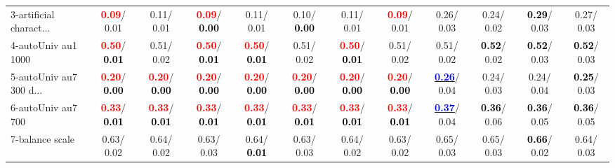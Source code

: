 \begin{table}[h]
\begin{center}
{\begin{tabular}{lc|c|c|c|c|c|c|c|c|c|c}
3-artificial charact... & \textcolor{red}{\textbf{  0.09}}/  0.01 &   0.11/  0.01 & \textcolor{red}{\textbf{  0.09}}/\textcolor{black}{\textbf{  0.00}} &   0.11/  0.01 &   0.10/\textcolor{black}{\textbf{  0.00}} &   0.11/  0.01 & \textcolor{red}{\textbf{  0.09}}/  0.01 &   0.26/  0.03 &   0.24/  0.02 & \textcolor{black}{\textbf{  0.29}}/  0.03 &   0.27/  0.03 \\
4-autoUniv au1 1000 & \textcolor{red}{\textbf{  0.50}}/\textcolor{black}{\textbf{  0.01}} &   0.51/  0.02 & \textcolor{red}{\textbf{  0.50}}/\textcolor{black}{\textbf{  0.01}} & \textcolor{red}{\textbf{  0.50}}/\textcolor{black}{\textbf{  0.01}} &   0.51/  0.02 & \textcolor{red}{\textbf{  0.50}}/\textcolor{black}{\textbf{  0.01}} &   0.51/  0.02 &   0.51/  0.02 & \textcolor{black}{\textbf{  0.52}}/  0.02 & \textcolor{black}{\textbf{  0.52}}/  0.03 & \textcolor{black}{\textbf{  0.52}}/  0.03 \\
5-autoUniv au7 300 d... & \textcolor{red}{\textbf{  0.20}}/\textcolor{black}{\textbf{  0.00}} & \textcolor{red}{\textbf{  0.20}}/\textcolor{black}{\textbf{  0.00}} & \textcolor{red}{\textbf{  0.20}}/\textcolor{black}{\textbf{  0.00}} & \textcolor{red}{\textbf{  0.20}}/\textcolor{black}{\textbf{  0.00}} & \textcolor{red}{\textbf{  0.20}}/\textcolor{black}{\textbf{  0.00}} & \textcolor{red}{\textbf{  0.20}}/\textcolor{black}{\textbf{  0.00}} & \textcolor{red}{\textbf{  0.20}}/\textcolor{black}{\textbf{  0.00}} & \underline{\textcolor{blue}{\textbf{  0.26}}}/  0.04 &   0.24/  0.03 &   0.24/  0.04 & \textcolor{black}{\textbf{  0.25}}/  0.03 \\
6-autoUniv au7 700 & \textcolor{red}{\textbf{  0.33}}/\textcolor{black}{\textbf{  0.01}} & \textcolor{red}{\textbf{  0.33}}/\textcolor{black}{\textbf{  0.01}} & \textcolor{red}{\textbf{  0.33}}/\textcolor{black}{\textbf{  0.01}} & \textcolor{red}{\textbf{  0.33}}/\textcolor{black}{\textbf{  0.01}} & \textcolor{red}{\textbf{  0.33}}/\textcolor{black}{\textbf{  0.01}} & \textcolor{red}{\textbf{  0.33}}/\textcolor{black}{\textbf{  0.01}} & \textcolor{red}{\textbf{  0.33}}/\textcolor{black}{\textbf{  0.01}} & \underline{\textcolor{blue}{\textbf{  0.37}}}/  0.04 & \textcolor{black}{\textbf{  0.36}}/  0.06 & \textcolor{black}{\textbf{  0.36}}/  0.05 & \textcolor{black}{\textbf{  0.36}}/  0.05 \\
7-balance scale &   0.63/  0.02 &   0.64/  0.02 &   0.63/  0.03 &   0.64/\textcolor{black}{\textbf{  0.01}} &   0.63/  0.03 &   0.64/  0.02 &   0.63/  0.02 &   0.65/  0.03 &   0.65/  0.03 & \textcolor{black}{\textbf{  0.66}}/  0.02 &   0.64/  0.03 \\ \hline

\end{tabular}}
\end{center}
\end{table}
